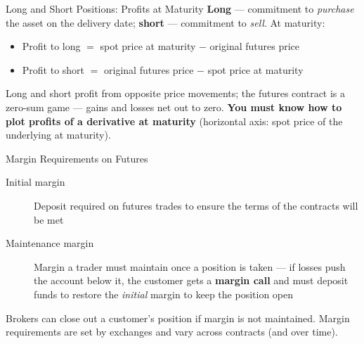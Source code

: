 \documentclass[aspectratio=169]{beamer}
\begin{document}
\begin{frame}{Long and Short Positions: Profits at Maturity}
\textbf{Long} --- commitment to \emph{purchase} the asset on the delivery date; \textbf{short} --- commitment to \emph{sell}. At maturity:
\begin{itemize}
  \item Profit to long $=$ spot price at maturity $-$ original futures price
  \item Profit to short $=$ original futures price $-$ spot price at maturity
\end{itemize}
\begin{center}
\end{center}
Long and short profit from opposite price movements; the futures contract is a zero-sum game --- gains and losses net out to zero. \textbf{You must know how to plot profits of a derivative at maturity} (horizontal axis: spot price of the underlying at maturity).
\end{frame}

\begin{frame}{Margin Requirements on Futures}
\begin{description}
  \item[Initial margin] Deposit required on futures trades to ensure the terms of the contracts will be met
  \item[Maintenance margin] Margin a trader must maintain once a position is taken --- if losses push the account below it, the customer gets a \textbf{margin call} and must deposit funds to restore the \emph{initial} margin to keep the position open
\end{description}
\vspace{0.3em}
Brokers can close out a customer's position if margin is not maintained. Margin requirements are set by exchanges and vary across contracts (and over time).
\end{frame}
\end{document}
